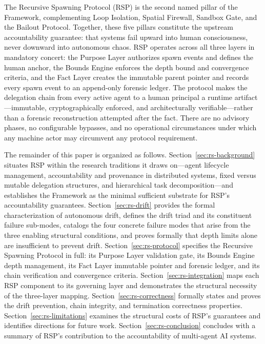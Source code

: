 The Recursive Spawning Protocol (RSP) is the second named pillar of the \bxthree{} Framework, complementing Loop Isolation, Spatial Firewall, Sandbox Gate, and the Bailout Protocol. Together, these five pillars constitute the upstream accountability guarantee: that \bxthree{} systems fail upward into human consciousness, never downward into autonomous chaos. RSP operates across all three \bxthree{} layers in mandatory concert: the Purpose Layer authorizes spawn events and defines the human anchor, the Bounds Engine enforces the depth bound and convergence criteria, and the Fact Layer creates the immutable parent pointer and records every spawn event to an append-only forensic ledger. The protocol makes the delegation chain from every active agent to a human principal a runtime artifact—immutable, cryptographically enforced, and architecturally verifiable—rather than a forensic reconstruction attempted after the fact. There are no advisory phases, no configurable bypasses, and no operational circumstances under which any machine actor may circumvent any protocol requirement.

The remainder of this paper is organized as follows. Section~\ref{sec:rs-background} situates RSP within the research traditions it draws on—agent lifecycle management, accountability and provenance in distributed systems, fixed versus mutable delegation structures, and hierarchical task decomposition—and establishes the \bxthree{} Framework as the minimal sufficient substrate for RSP's accountability guarantees. Section~\ref{sec:rs-drift} provides the formal characterization of autonomous drift, defines the drift triad and its constituent failure sub-modes, catalogs the four concrete failure modes that arise from the three enabling structural conditions, and proves formally that depth limits alone are insufficient to prevent drift. Section~\ref{sec:rs-protocol} specifies the Recursive Spawning Protocol in full: its Purpose Layer validation gate, its Bounds Engine depth management, its Fact Layer immutable pointer and forensic ledger, and its chain verification and convergence criteria. Section~\ref{sec:rs-integration} maps each RSP component to its governing \bxthree{} layer and demonstrates the structural necessity of the three-layer mapping. Section~\ref{sec:rs-correctness} formally states and proves the drift prevention, chain integrity, and termination correctness properties. Section~\ref{sec:rs-limitations} examines the structural costs of RSP's guarantees and identifies directions for future work. Section~\ref{sec:rs-conclusion} concludes with a summary of RSP's contribution to the accountability of multi-agent AI systems.